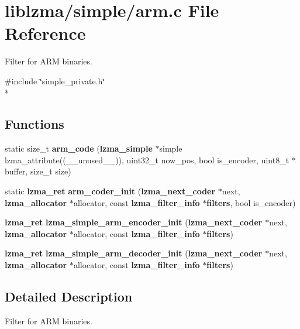 \section{liblzma/simple/arm.c File Reference}
\label{arm_8c}


Filter for A\-R\-M binaries.  


{\ttfamily \#include \char`\"{}simple\-\_\-private.\-h\char`\"{}}\\*
\subsection*{Functions}
\begin{DoxyCompactItemize}
\item 
static size\-\_\-t {\bfseries arm\-\_\-code} ({\bf lzma\-\_\-simple} $\ast$simple lzma\-\_\-attribute((\-\_\-\-\_\-unused\-\_\-\-\_\-)), uint32\-\_\-t now\-\_\-pos, bool is\-\_\-encoder, uint8\-\_\-t $\ast$buffer, size\-\_\-t size)\label{arm_8c_a29b05ca7ef3edf1ff6a939ceb8a4f93b}

\item 
static {\bf lzma\-\_\-ret} {\bfseries arm\-\_\-coder\-\_\-init} ({\bf lzma\-\_\-next\-\_\-coder} $\ast$next, {\bf lzma\-\_\-allocator} $\ast$allocator, const {\bf lzma\-\_\-filter\-\_\-info} $\ast${\bf filters}, bool is\-\_\-encoder)\label{arm_8c_afa3177e8b27e099da111380a084714d8}

\item 
{\bf lzma\-\_\-ret} {\bfseries lzma\-\_\-simple\-\_\-arm\-\_\-encoder\-\_\-init} ({\bf lzma\-\_\-next\-\_\-coder} $\ast$next, {\bf lzma\-\_\-allocator} $\ast$allocator, const {\bf lzma\-\_\-filter\-\_\-info} $\ast${\bf filters})\label{arm_8c_ab5a716394b54bc7c1a2188315b7a44e4}

\item 
{\bf lzma\-\_\-ret} {\bfseries lzma\-\_\-simple\-\_\-arm\-\_\-decoder\-\_\-init} ({\bf lzma\-\_\-next\-\_\-coder} $\ast$next, {\bf lzma\-\_\-allocator} $\ast$allocator, const {\bf lzma\-\_\-filter\-\_\-info} $\ast${\bf filters})\label{arm_8c_a8c7ec4a714ebfebf3f4931f46dd137c5}

\end{DoxyCompactItemize}


\subsection{Detailed Description}
Filter for A\-R\-M binaries. 